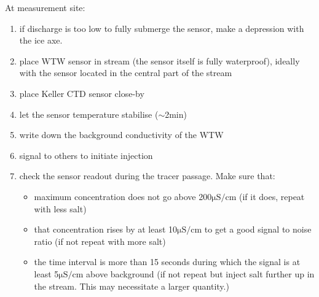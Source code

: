 \documentclass[DIV=15,halfparskip,11pt,headinclude]{scrartcl}
\begin{document}
At measurement site:
\begin{enumerate}
\item if discharge is too low to fully submerge the sensor, make a
depression with the ice axe.
\item place WTW sensor in stream (the sensor itself is fully waterproof),
  ideally with the sensor located in the central part of the stream
\item place Keller CTD sensor close-by
\item let the sensor temperature stabilise ($\sim$2min)
\item write down the background conductivity of the WTW
\item signal to others to initiate injection
\item check the sensor readout during the tracer passage.  Make sure
  that:
\begin{itemize}
\item maximum concentration does not go above 200$\mathrm{\mu S/cm}$
  (if it does, repeat with less salt)
\item that concentration rises by at least 10$\mathrm{\mu S/cm}$ to get
  a good signal to noise ratio (if not repeat with more salt)
\item the time interval is more than 15 seconds during which the
  signal is at least 5$\mathrm{\mu S/cm}$ above background (if not
  repeat but inject salt further up in the stream.  This may
  necessitate a larger quantity.)
\end{itemize}
\end{enumerate}
\end{document}
